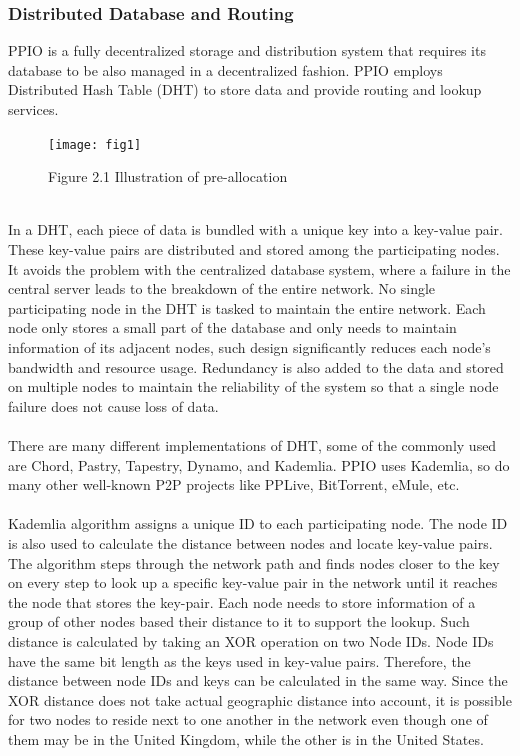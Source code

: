 \documentclass[10pt,a4paper]{article}
\begin{document}
         \subsubsection{Distributed Database and Routing}  %
PPIO is a fully decentralized storage and distribution system that requires its database to be also managed in a decentralized fashion. PPIO employs Distributed Hash Table (DHT) to store data and provide routing and lookup services.\\
\vspace{-0.5em}
\begin{figure}[!htb]   %
    \centering
    \texttt{[image: fig1]}
    \label{circuit}
    \centerline{{Figure 2.1 Illustration of pre-allocation}}
    \vspace{-2.5em}
\end{figure} \\
In a DHT, each piece of data is bundled with a unique key into a key-value pair. These key-value pairs are distributed and stored among the participating nodes. It avoids the problem with the centralized database system, where a failure in the central server leads to the breakdown of the entire network. No single participating node in the DHT is tasked to maintain the entire network. Each node only stores a small part of the database and only needs to maintain information of its adjacent nodes, such design significantly reduces each node’s bandwidth and resource usage. Redundancy is also added to the data and stored on multiple nodes to maintain the reliability of the system so that a single node failure does not cause loss of data.
\vspace{-0.5em}
 \\ \\ There are many different implementations of DHT, some of the commonly used are Chord\cite{article14}, Pastry\cite{article15}, Tapestry\cite{article18}, Dynamo\cite{article19}, and Kademlia\cite{article16}. PPIO uses Kademlia, so do many other well-known P2P projects like PPLive, BitTorrent, eMule, etc.
 \vspace{-0.5em}
 \\ \\Kademlia algorithm assigns a unique ID to each participating node. The node ID is also used to calculate the distance between nodes and locate key-value pairs. The algorithm steps through the network path and finds nodes closer to the key on every step to look up a specific key-value pair in the network until it reaches the node that stores the key-pair. Each node needs to store information of a group of other nodes based their distance to it to support the lookup. Such distance is calculated by taking an XOR operation on two Node IDs. Node IDs have the same bit length as the keys used in key-value pairs. Therefore, the distance between node IDs and keys can be calculated in the same way. Since the XOR distance does not take actual geographic distance into account, it is possible for two nodes to reside next to one another in the network even though one of them may be in the United Kingdom, while the other is in the United States.
\end{document}

